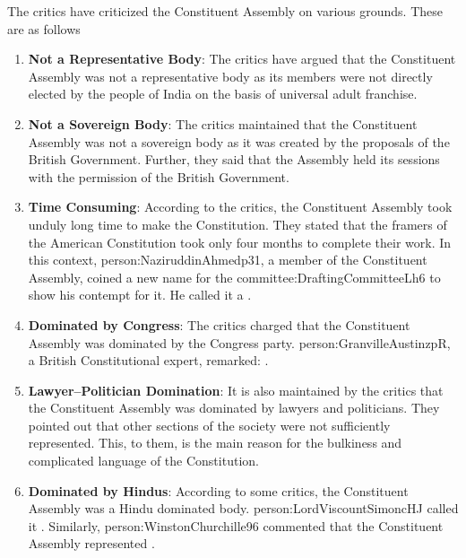 The critics have criticized the Constituent Assembly on various grounds. These are as follows

\begin{enumerate}
  \item \textbf{Not a Representative Body}: The critics have argued that the Constituent  Assembly was not a representative body as its members were not directly elected by the people of India on the basis of universal adult franchise.
  \item \textbf{Not a Sovereign Body}: The critics maintained that the Constituent Assembly was not a sovereign body as it was created by the proposals of the British Government. Further, they said that the Assembly held its sessions with the permission of the British Government.
  \item \textbf{Time Consuming}: According to the critics, the Constituent Assembly took unduly long time to make the Constitution. They stated that the framers of the American Constitution took only four months to complete their work. In this context, \gls{person:NaziruddinAhmedp31}, a member of the Constituent Assembly, coined a new name for the \gls{committee:DraftingCommitteeLh6} to show his contempt for it. He called it a .
  \item \textbf{Dominated by Congress}: The critics charged that the Constituent Assembly was dominated by the Congress party. \gls{person:GranvilleAustinzpR}, a British Constitutional expert, remarked: .
  \item \textbf{Lawyer–Politician Domination}: It is also maintained by the critics that the Constituent Assembly was dominated by lawyers and politicians. They pointed out that other sections of the society were not sufficiently represented. This, to them, is the main reason for the bulkiness and complicated language of the Constitution.
  \item \textbf{Dominated by Hindus}: According to some critics, the Constituent Assembly was a Hindu dominated body. \gls{person:LordViscountSimoncHJ} called it . Similarly, \gls{person:WinstonChurchille96} commented that the Constituent Assembly represented .
\end{enumerate}



